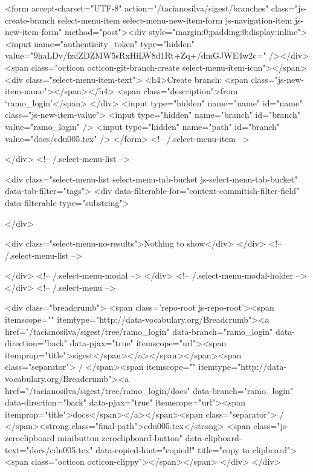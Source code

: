           <form accept-charset="UTF-8" action="/tacianosilva/sigest/branches" class="js-create-branch select-menu-item select-menu-new-item-form js-navigation-item js-new-item-form" method="post"><div style="margin:0;padding:0;display:inline"><input name="authenticity_token" type="hidden" value="9haLDv/fzdZDZMW5sRxHiLW8d1Rt+Zq+/dmGJWE4w2c=" /></div>
            <span class="octicon octicon-git-branch-create select-menu-item-icon"></span>
            <div class="select-menu-item-text">
              <h4>Create branch: <span class="js-new-item-name"></span></h4>
              <span class="description">from ‘ramo_login’</span>
            </div>
            <input type="hidden" name="name" id="name" class="js-new-item-value">
            <input type="hidden" name="branch" id="branch" value="ramo_login" />
            <input type="hidden" name="path" id="branch" value="docs/cdu005.tex" />
          </form> <!-- /.select-menu-item -->

      </div> <!-- /.select-menu-list -->

      <div class="select-menu-list select-menu-tab-bucket js-select-menu-tab-bucket" data-tab-filter="tags">
        <div data-filterable-for="context-commitish-filter-field" data-filterable-type="substring">


        </div>

        <div class="select-menu-no-results">Nothing to show</div>
      </div> <!-- /.select-menu-list -->

    </div> <!-- /.select-menu-modal -->
  </div> <!-- /.select-menu-modal-holder -->
</div> <!-- /.select-menu -->

  <div class="breadcrumb">
    <span class='repo-root js-repo-root'><span itemscope="" itemtype="http://data-vocabulary.org/Breadcrumb"><a href="/tacianosilva/sigest/tree/ramo_login" data-branch="ramo_login" data-direction="back" data-pjax="true" itemscope="url"><span itemprop="title">sigest</span></a></span></span><span class="separator"> / </span><span itemscope="" itemtype="http://data-vocabulary.org/Breadcrumb"><a href="/tacianosilva/sigest/tree/ramo_login/docs" data-branch="ramo_login" data-direction="back" data-pjax="true" itemscope="url"><span itemprop="title">docs</span></a></span><span class="separator"> / </span><strong class="final-path">cdu005.tex</strong> <span class="js-zeroclipboard minibutton zeroclipboard-button" data-clipboard-text="docs/cdu005.tex" data-copied-hint="copied!" title="copy to clipboard"><span class="octicon octicon-clippy"></span></span>
  </div>
</div>


